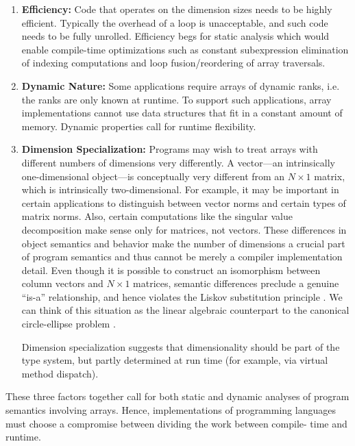 \documentclass[preprint]{sigplanconf}
\begin{document}
\begin{enumerate}

\item{\bf Efficiency:} Code that operates on the dimension sizes needs to be
highly efficient. Typically the overhead of a loop is unacceptable, and such
code needs to be fully unrolled. Efficiency begs for static analysis which
would enable compile-time optimizations such as constant subexpression
elimination of indexing computations and loop fusion/reordering of array
traversals.

\item{\bf Dynamic Nature:} Some applications require arrays of dynamic ranks,
i.e. the ranks are only known  at runtime. To support such applications,
array implementations cannot use data structures that fit in a constant
amount of memory. Dynamic properties call for runtime flexibility.

\item {\bf Dimension Specialization:} Programs may wish to treat arrays with
different numbers of dimensions very differently. A vector---an intrinsically
one-dimensional object---is conceptually very different from an $N\times1$
matrix, which is intrinsically two-dimensional. For example, it may be
important in certain applications to distinguish between vector norms and
certain types of matrix norms. Also, certain computations like the singular
value decomposition make sense only for matrices, not vectors. These
differences in object semantics and behavior make the number of dimensions a
crucial part of program semantics and thus cannot be merely a compiler
implementation detail. Even though it is possible to construct an isomorphism
between column vectors and $N\times1$ matrices, semantic differences preclude
a genuine ``is-a'' relationship, and hence violates the Liskov substitution
principle \cite{Liskov:1987da}. We can think of this situation as the linear
algebraic counterpart to the canonical circle-ellipse problem
\cite{Halbert:1987ut}.

Dimension specialization suggests that dimensionality should be part of the
type system, but partly determined at run time (for example, via virtual
method dispatch).

\end{enumerate}

These three factors together call for both static and dynamic analyses of
program semantics involving arrays. Hence, implementations of programming
languages must choose a compromise between dividing the work between compile-
time and runtime.
\end{document}
